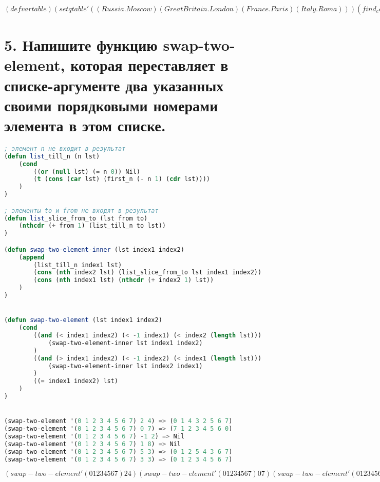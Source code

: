\documentclass[12pt]{report}
\begin{document}
$
(defvar table)
(setq table '((Russia . Moscow) (GreatBritain . London)                  (France . Paris) (Italy . Roma)))
(find_capital_by_country table 'Russia)
(find_capital_by_country table 'Italy)
(find_capital_by_country table 'USA)
(find_country_by_capital table 'Moscow)
(find_country_by_capital table 'Paris)
(find_country_by_capital table 'Washington)
$
\fi



\clearpage
\section*{5. Напишите функцию swap-two-element, которая переставляет в списке-аргументе два указанных своими порядковыми номерами элемента в этом списке.}

\begin{lstlisting}[language=Lisp]
; элемент n не входит в результат
(defun list_till_n (n lst) 
	(cond 
		((or (null lst) (= n 0)) Nil)
		(t (cons (car lst) (first_n (- n 1) (cdr lst))))
	)
)

; элементы to и from не входят в результат
(defun list_slice_from_to (lst from to)
	(nthcdr (+ from 1) (list_till_n to lst))
)

(defun swap-two-element-inner (lst index1 index2)
	(append 
		(list_till_n index1 lst)
		(cons (nth index2 lst) (list_slice_from_to lst index1 index2))
		(cons (nth index1 lst) (nthcdr (+ index2 1) lst))	
	)
)


(defun swap-two-element (lst index1 index2)
	(cond 
		((and (< index1 index2) (< -1 index1) (< index2 (length lst)))
			(swap-two-element-inner lst index1 index2)
		)
		((and (> index1 index2) (< -1 index2) (< index1 (length lst)))
			(swap-two-element-inner lst index2 index1)
		)
		((= index1 index2) lst)
	)
)


(swap-two-element '(0 1 2 3 4 5 6 7) 2 4) => (0 1 4 3 2 5 6 7)
(swap-two-element '(0 1 2 3 4 5 6 7) 0 7) => (7 1 2 3 4 5 6 0)
(swap-two-element '(0 1 2 3 4 5 6 7) -1 2) => Nil
(swap-two-element '(0 1 2 3 4 5 6 7) 1 8) => Nil
(swap-two-element '(0 1 2 3 4 5 6 7) 5 3) => (0 1 2 5 4 3 6 7)
(swap-two-element '(0 1 2 3 4 5 6 7) 3 3) => (0 1 2 3 4 5 6 7)
\end{lstlisting}

$
(swap-two-element '(0 1 2 3 4 5 6 7) 2 4)
(swap-two-element '(0 1 2 3 4 5 6 7) 0 7)
(swap-two-element '(0 1 2 3 4 5 6 7) 5 3)
(swap-two-element '(0 1 2 3 4 5 6 7) 3 3)
(swap-two-element '(0 1 2 3 4 5 6 7) -1 2)
(swap-two-element '(0 1 2 3 4 5 6 7) 1 8)
$
\fi




	

	
\end{document}
